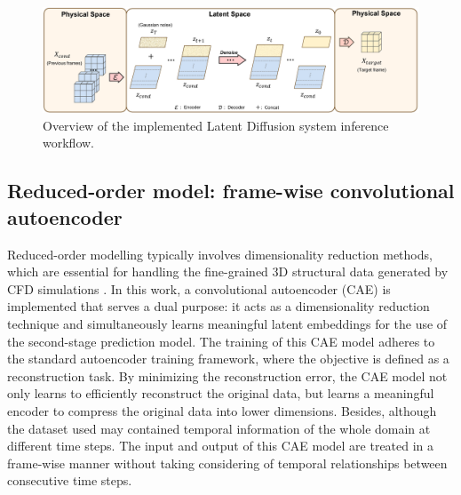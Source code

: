 \documentclass[final-report]{article-template}
\begin{document}
\begin{figure}[htbp]
    \centering
    \includegraphics[width=16cm]{figures/workflow.png}
    \caption{Overview of the implemented Latent Diffusion system inference workflow.}
    \label{fig:workflow}
\end{figure}

\subsection{Reduced-order model: frame-wise convolutional autoencoder}
Reduced-order modelling typically involves dimensionality reduction methods, which are essential for handling the fine-grained 3D structural data generated by CFD simulations \cite{zuo2010fast, masoumi2022review}. In this work, a convolutional autoencoder (CAE) is implemented that serves a dual purpose: it acts as a dimensionality reduction technique and simultaneously learns meaningful latent embeddings for the use of the second-stage prediction model. The training of this CAE model adheres to the standard autoencoder training framework, where the objective is defined as a reconstruction task. By minimizing the reconstruction error, the CAE model not only learns to efficiently reconstruct the original data, but learns a meaningful encoder to compress the original data into lower dimensions. Besides, although the dataset used may contained temporal information of the whole domain at different time steps. The input and output of this CAE model are treated in a frame-wise manner without taking considering of temporal relationships between consecutive time steps. \\ 
\end{document}
